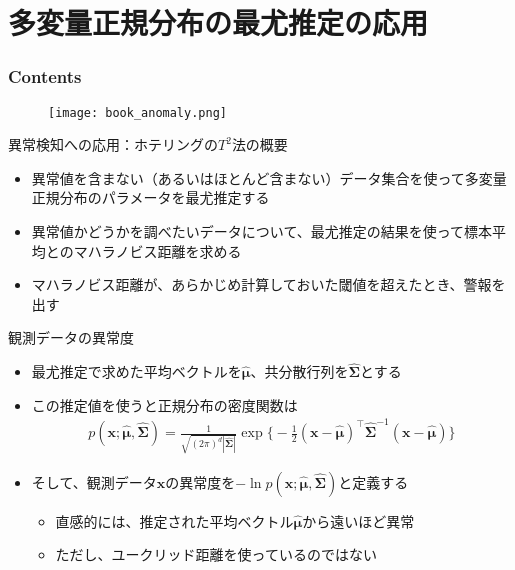 \documentclass[aspectratio=169,unicode,dvipdfmx,14pt]{beamer}
\begin{document}
\section{多変量正規分布の最尤推定の応用}

\begin{frame}\frametitle{Contents}
\Large \tableofcontents[currentsection]
\end{frame}

\begin{frame}
\begin{figure}[htbp]
\begin{center}
\texttt{[image: book\_anomaly.png]}
\end{center}
\end{figure}
\end{frame}

\begin{frame}{異常検知への応用：ホテリングの$T^2$法の概要}
\begin{itemize}
\item 異常値を含まない（あるいはほとんど含まない）データ集合を使って多変量正規分布のパラメータを最尤推定する
\item 異常値かどうかを調べたいデータについて、最尤推定の結果を使って標本平均とのマハラノビス距離を求める
\item マハラノビス距離が、あらかじめ計算しておいた閾値を超えたとき、警報を出す
\end{itemize}
\end{frame}

\begin{frame}{観測データの異常度}
\begin{itemize}
\item 最尤推定で求めた平均ベクトルを$\hat{\bm{\mu}}$、共分散行列を$\hat{\bm{\Sigma}}$とする
\item この推定値を使うと正規分布の密度関数は
\begin{align}
p(\bm{x};\hat{\bm{\mu}},\hat{\bm{\Sigma}}) = 
\frac{1}{\sqrt{(2\pi)^d|\hat{\bm{\Sigma}}|}} \exp \bigg\{
- \frac{1}{2} (\bm{x} - \hat{\bm{\mu}})^\intercal \hat{\bm{\Sigma}}^{-1}
(\bm{x} - \hat{\bm{\mu}}) \bigg\}
\end{align}
\item そして、観測データ$\bm{x}$の異常度を$-\ln p(\bm{x};\hat{\bm{\mu}},\hat{\bm{\Sigma}})$と定義する
\begin{itemize}
\item 直感的には、推定された平均ベクトル$\hat{\bm{\mu}}$から遠いほど異常
\item ただし、ユークリッド距離を使っているのではない
\end{itemize}
\end{itemize}
\end{frame}
\end{document}
